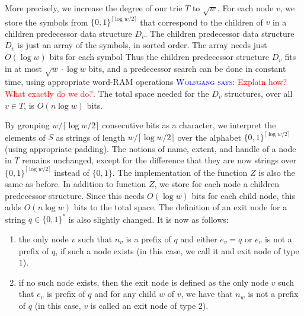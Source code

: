 \documentclass[a4paper,11pt]{article}
\newcommand{\?}{\mskip1.5mu}
\newcommand{\aremark}[3]{\textcolor{blue}{\textsc{#1 #2:}}
  \textcolor{red}{\textsf{#3}}}
\newcommand{\wolfgang}[2][says]{\aremark{Wolfgang}{#1}{#2}}
\begin{document}
More precisely, we increase the degree of our trie $T$ 
to $\sqrt{w}$. For each node 
$v$, we store the symbols from $\{0, 1\}^{\lceil \log w / 2 \rceil}$
that correspond to the children of $v$
in a children predecessor data 
structure $D_v$. 
The children predecessor data structure 
$D_v$ is just an array of the symbols, in sorted order. 
The array needs just $O(\log w)$ bits for each symbol
Thus the children predecessor structure $D_v$ fits in at most 
$\sqrt{w} \cdot {\log w}$ bits, and a predecessor search can 
be done in constant time, using appropriate word-RAM operations
\wolfgang{Explain how? What exactly do we do?}. 
The total space needed for the $D_v$ structures, over all $v \in T$,
is $O(n\log w)$ bits. 

By grouping
$w/\lceil\log w/2\rceil$ consecutive 
bits as a character, we interpret the 
elements of $S$ as strings of length $w/\lceil\log w/2\rceil$ 
over the alphabet $\{0, 1\}^{\lceil \log w / 2 \rceil}$ (using
appropriate padding).
The notions of name, 
extent, and handle of a node in $T$ remains unchanged, except for 
the difference that they are now strings over 
$\{0, 1\}^{\lceil\log w/2\rceil}$ instead of $\{0,1\}$. 
The implementation of the function $Z$ is also the same as before. 
In addition to function $Z$, we store for each node a children
predecessor structure. Since this needs $O(\log w)$ bits for each
child node, this adds 
$O(n\log w)$ bits to the total space. 
The definition of an exit node for a string $q \in \{0, 1\}^*$ 
is also slightly changed. 
It is now as follows:
\begin{enumerate}
\item the only node $v$ such that $n_v$ is a prefix of $q$ and 
either $e_v = q$ or $e_v$ is not a prefix of $q$, 
if such a node exists (in this case, we call it 
and exit node of type $1$). 
\item if no such node exists, then the exit node 
is defined as the only node $v$ such that $e_v$ is prefix of 
$q$ and for any child $w$ of $v$, we have that $n_w$ is not a prefix of 
$q$ (in this case, $v$ is called an exit node of type $2$). 
\end{enumerate}
\end{document}
